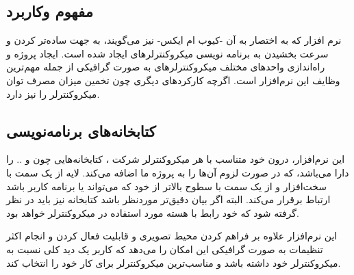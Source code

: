\subsection{مفهوم وکاربرد}
نرم افزار  که به اختصار به آن  -کیوب ام ایکس- نیز می‌گویند، به جهت ساده‌تر کردن و سرعت بخشیدن به برنامه نویسی میکروکنترلرهای  ایجاد شده است. ایجاد پروژه و راه‌اندازی واحدهای مختلف میکروکنترلرهای  به صورت گرافیکی از جمله مهم‌ترین وظایف این نرم‌افزار است. اگرچه کارکردهای دیگری چون تخمین میزان مصرف توان میکروکنترلر را نیز دارد.

\subsection{کتابخانه‌های برنامه‌نویسی}
این نرم‌افزار، درون خود متناسب با هر میکروکنترلر شرکت  ، کتابخانه‌هایی چون  و ..   را دارا می‌باشد، که در صورت لزوم آن‌ها را به پروژه ما اضافه می‌کند. لایه  از یک سمت با سخت‌افزار و از یک سمت با سطوح بالاتر از خود که می‌تواند  یا برنامه کاربر باشد ارتباط برقرار می‌کند. البته اگر بیان دقیق‌تر موردنظر باشد کتابخانه  نیز باید در نظر گرفته شود که خود رابط  با هسته  مورد استفاده در میکروکنترلر خواهد بود.

این نرم‌افزار علاوه بر فراهم کردن محیط تصویری و قابلیت فعال کردن و انجام اکثر تنظیمات به صورت گرافیکی این امکان را می‌دهد که کاربر یک دید کلی نسبت به میکروکنترلر خود داشته باشد و مناسب‌ترین میکروکنترلر برای کار خود را انتخاب کند.

